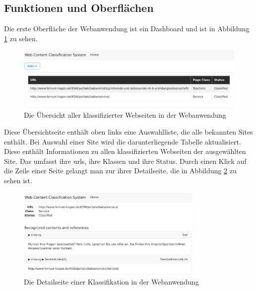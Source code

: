 \subsection{Funktionen und Oberflächen}
    \label{section:solutionDetailsWebAppFunctions}
    Die erste Oberfläche der Webanwendung ist ein Dashboard
    und ist in Abbildung \ref{image:webAppDashboard} zu sehen.

    \begin{figure}[htb]
        \centering
        \includegraphics[width=\textwidth]{../resources/web-app/dashboard.png}
        \caption{Die Übersicht aller klassifizierter Webseiten in der Webanwendung}
        \label{image:webAppDashboard}
    \end{figure}

    Diese Übersichtseite enthält oben links eine Auswahlliste, die alle bekannten Sites enthält.
    Bei Auswahl einer Site wird die darunterliegende Tabelle aktualisiert.
    Diese enthält Informationen zu allen klassifizierten Webseiten der ausgewählten Site.
    Das umfasst ihre \glspl{url}, ihre Klassen und ihre Status.
    Durch einen Klick auf die Zeile einer Seite
    gelangt man zur ihrer Detailseite,
    die in Abbildung \ref{image:webAppDetailPage} zu sehen ist.

    \begin{figure}[htb]
        \centering
        \includegraphics[width=0.8\textwidth]{../resources/web-app/detail-page.png}
        \caption{Die Detailseite einer Klassifikation in der Webanwendung}
        \label{image:webAppDetailPage}
    \end{figure}

